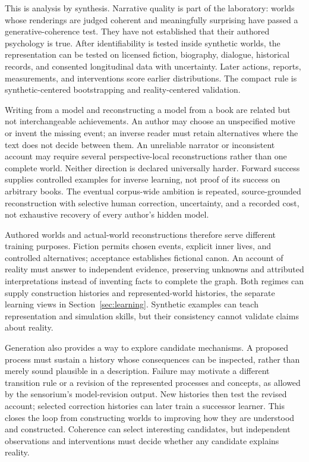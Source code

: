 \documentclass[10pt]{article}
\begin{document}
This is analysis by synthesis. Narrative quality is part of the laboratory:
worlds whose renderings are judged coherent and meaningfully surprising have
passed a generative-coherence test. They have not established that their
authored psychology is true. After identifiability is tested inside synthetic
worlds, the representation can be tested on licensed fiction, biography,
dialogue, historical records, and consented longitudinal data with uncertainty.
Later actions, reports, measurements, and interventions score earlier
distributions. The compact rule is synthetic-centered bootstrapping and
reality-centered validation.

Writing from a model and reconstructing a model from a book are related but
not interchangeable achievements. An author may choose an unspecified motive
or invent the missing event; an inverse reader must retain alternatives where
the text does not decide between them. An unreliable narrator or inconsistent
account may require several perspective-local reconstructions rather than one
complete world. Neither direction is declared universally harder. Forward
success supplies controlled examples for inverse learning, not proof of its
success on arbitrary books. The eventual corpus-wide ambition is repeated,
source-grounded reconstruction with selective human correction, uncertainty,
and a recorded cost, not exhaustive recovery of every author's hidden model.

Authored worlds and actual-world reconstructions therefore serve different
training purposes. Fiction permits chosen events, explicit inner lives, and
controlled alternatives; acceptance establishes fictional canon. An account
of reality must answer to independent evidence, preserving unknowns and
attributed interpretations instead of inventing facts to complete the graph.
Both regimes can supply construction histories and represented-world
histories, the separate learning views in Section~\ref{sec:learning}.
Synthetic examples can teach representation and simulation skills, but their
consistency cannot validate claims about reality.

Generation also provides a way to explore candidate mechanisms. A proposed
process must sustain a history whose consequences can be inspected, rather
than merely sound plausible in a description. Failure may motivate a different
transition rule or a revision of the represented processes and concepts, as
allowed by the sensorium's model-revision output. New histories then test the
revised account; selected correction histories can later train a successor
learner. This closes the loop from constructing worlds to improving how they
are understood and constructed. Coherence can select interesting candidates,
but independent observations and interventions must decide whether any
candidate explains reality.
\end{document}
